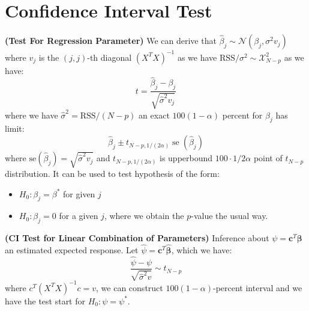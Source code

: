 \section{Confidence Interval Test}

\begin{remark}{\textbf{(Test For Regression Parameter)}}
    We can derive that $\hat{\beta}_j \sim \mathcal{N}(\beta_j, \sigma^2v_j)$ where $v_j$ is the $(j, j)$-th diagonal $(X^TX)^{-1}$ as we have $\text{RSS}/\sigma^2\sim\mathcal{X}^2_{N-p}$ as we have:
    \begin{equation*}
        t = \frac{\hat{\beta}_j - \beta_j}{\sqrt{\hat{\sigma}^2 v_j}}
    \end{equation*}
    where we have $\hat{\sigma}^2 = \text{RSS}/(N-p)$ an exact $100(1-\alpha)$ percent for $\beta_j$ has limit: 
    \begin{equation*}
        \hat{\beta}_j \pm t_{N-p, 1/(2\alpha)}\operatorname{se}(\hat{\beta}_j)
    \end{equation*}
    where $\text{se}(\hat{\beta}_j) = \sqrt{\hat{\sigma}^2v_j}$ and $t_{N-p, 1/(2\alpha)}$ is upperbound $100\cdot1/2\alpha$ point of $t_{N-p}$ distribution. It can be used to test hypothesis of the form:
    \begin{itemize}
        \item $H_0 : \beta_j = \beta^*$ for given $j$
        \item $H_0 : \beta_j = 0$ for a given $j$, where we obtain the $p$-value the usual way. 
    \end{itemize}
\end{remark}

\begin{remark}{\textbf{(CI Test for Linear Combination of Parameters)}}
    Inference about $\psi = \boldsymbol c^T\boldsymbol \beta$ an estimated expected response. Let $\hat{\psi} = \boldsymbol c^T\hat{\boldsymbol \beta}$, which we have:
    \begin{equation*}
        \frac{\hat{\psi} - \psi}{\sqrt{\hat{\sigma}^2 v}} \sim t_{N-p}
    \end{equation*}
    where $c^T(X^TX)^{-1}c = v$, we can construct $100(1-\alpha)$-percent interval and we have the test start for $H_0: \psi = \psi^*$.
\end{remark}

